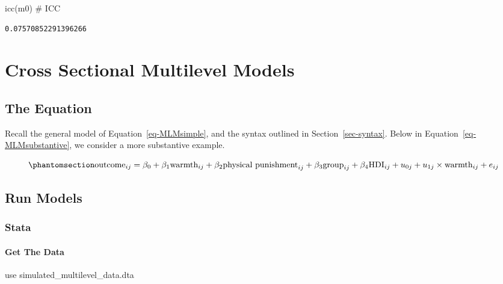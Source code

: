 \documentclass[
  letterpaper,
  DIV=11,
  numbers=noendperiod]{scrreprt}
\newenvironment{Shaded}{\begin{snugshade}}{\end{snugshade}}
\newcommand{\CommentTok}[1]{\textcolor[rgb]{0.37,0.37,0.37}{#1}}
\newcommand{\FunctionTok}[1]{\textcolor[rgb]{0.28,0.35,0.67}{#1}}
\newcommand{\KeywordTok}[1]{\textcolor[rgb]{0.00,0.23,0.31}{#1}}
\newcommand{\NormalTok}[1]{\textcolor[rgb]{0.00,0.23,0.31}{#1}}
\begin{document}
\begin{Shaded}
\begin{Highlighting}[]

\FunctionTok{icc}\NormalTok{(m0) }\CommentTok{\# ICC}
\end{Highlighting}
\end{Shaded}

\begin{verbatim}
0.07570852291396266
\end{verbatim}


\chapter{Cross Sectional Multilevel
Models}\label{cross-sectional-multilevel-models}

\section{The Equation}\label{the-equation-1}

Recall the general model of Equation~\ref{eq-MLMsimple}, and the syntax
outlined in Section~\ref{sec-syntax}. Below in
Equation~\ref{eq-MLMsubstantive}, we consider a more substantive
example.

\begin{equation}\phantomsection\label{eq-MLMsubstantive}{\text{outcome}_{ij}= \beta_0 + \beta_1 \text{warmth}_{ij} + \beta_2 \text{physical punishment}_{ij} + \\ \beta_3 \text{group}_{ij} + \beta_4 \text{HDI}_{ij} + \\ u_{0j} + u_{1j} \times \text{warmth}_{ij} + e_{ij}}\end{equation}

\section{Run Models}\label{run-models-1}

\subsection{Stata}

\subsubsection{Get The Data}\label{get-the-data}

\begin{Shaded}
\begin{Highlighting}[]

\KeywordTok{use}\NormalTok{ simulated\_multilevel\_data.dta}
\end{Highlighting}
\end{Shaded}
\end{document}
